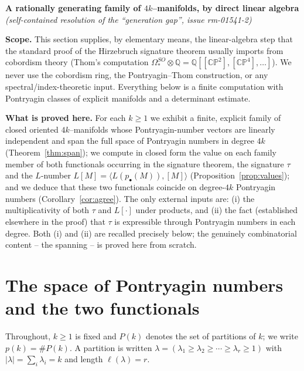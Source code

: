\documentclass[12pt]{article}
\theoremstyle{definition}
\begin{document}
\begin{center}
\textbf{\large A rationally generating family of $4k$--manifolds, by direct linear
algebra}\\[2pt]
\textit{(self-contained resolution of the ``generation gap'', issue rm-01541-2)}
\end{center}

\bigskip

\noindent
\textbf{Scope.}
This section supplies, by elementary means, the linear-algebra step that the standard
proof of the Hirzebruch signature theorem usually imports from cobordism theory
(Thom's computation $\Omega^{SO}_\ast\otimes\mathbb{Q}=
\mathbb{Q}[[\mathbb{CP}^2],[\mathbb{CP}^4],\dots]$).  We never use the cobordism ring,
the Pontryagin--Thom construction, or any spectral/index-theoretic input.  Everything
below is a finite computation with Pontryagin classes of explicit manifolds and a
determinant estimate.

\medskip

\noindent
\textbf{What is proved here.}
For each $k\ge 1$ we exhibit a finite, explicit family of closed oriented
$4k$--manifolds whose Pontryagin-number vectors are linearly independent and span the
full space of Pontryagin numbers in degree $4k$ (Theorem~\ref{thm:span}); we compute in
closed form the value on each family member of both functionals occurring in the
signature theorem, the signature $\tau$ and the $L$-number
$L[M]=\langle L(p_\bullet(M)),[M]\rangle$ (Proposition~\ref{prop:values}); and we deduce
that these two functionals coincide on degree-$4k$ Pontryagin numbers
(Corollary~\ref{cor:agree}).  The only external inputs are: (i) the multiplicativity of
both $\tau$ and $L[\cdot]$ under products, and (ii) the fact (established elsewhere in
the proof) that $\tau$ is expressible through Pontryagin numbers in each degree.  Both
(i) and (ii) are recalled precisely below; the genuinely combinatorial content -- the
spanning -- is proved here from scratch.

\bigskip

\section{The space of Pontryagin numbers and the two functionals}

Throughout, $k\ge 1$ is fixed and $P(k)$ denotes the set of partitions of $k$; we write
$p(k)=\#P(k)$.  A partition is written $\lambda=(\lambda_1\ge\lambda_2\ge\cdots\ge
\lambda_r\ge 1)$ with $|\lambda|=\sum_i\lambda_i=k$ and length $\ell(\lambda)=r$.
\end{document}
